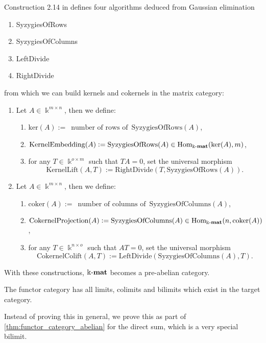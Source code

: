 \begin{example}\label{ex:kmat_pre-abelian}
Construction 2.14 in \cite{[Posur]} defines four algorithms deduced from Gaussian elimination
\begin{enumerate}
\renewcommand{\labelenumi}{(\theenumi)}
\item SyzygiesOfRows
\item SyzygiesOfColumns
\item LeftDivide
\item RightDivide
\end{enumerate}
from which we can build kernels and cokernels in the matrix category:
\begin{enumerate}
\renewcommand{\labelenumi}{(\theenumi)}
\item Let $A \in \Bbbk^{m\times n}$, then we define:
\begin{enumerate}
\renewcommand{\labelenumii}{(\alph{enumii})}
\item $\mathrm{ker}(A) :=\,\text{ number of rows of }\,\mathrm{SyzygiesOfRows}(A)$,
\item $\mathrm{KernelEmbedding}(A) := \mathrm{SyzygiesOfRows}(A) \in \mathrm{Hom}_{\Bbbk\textnormal{-}\mathbf{mat}}(\mathrm{ker}(A), m)$,
\item for any $T \in \Bbbk^{o\times m}$ such that $TA = 0$, set the universal morphism
\[
\mathrm{KernelLift}(A,T) := \mathrm{RightDivide}(T, \mathrm{SyzygiesOfRows}(A)).
\]
\end{enumerate}
\item Let $A \in \Bbbk^{m\times n}$, then we define:
\begin{enumerate}
\renewcommand{\labelenumii}{(\alph{enumii})}
\item $\mathrm{coker}(A) :=\,\text{ number of columns of }\,\mathrm{SyzygiesOfColumns}(A)$,
\item $\mathrm{CokernelProjection}(A) := \mathrm{SyzygiesOfColumns}(A) \in \mathrm{Hom}_{\Bbbk\textnormal{-}\mathbf{mat}}(n, \mathrm{coker}(A))$,
\item for any $T \in \Bbbk^{n\times o}$ such that $AT = 0$, set the universal morphism
\[
\mathrm{CokernelColift}(A,T) := \mathrm{LeftDivide}(\mathrm{SyzygiesOfColumns}(A), T).
\]
\end{enumerate}
\end{enumerate}
With these constructions, $\Bbbk\textnormal{-}\mathbf{mat}$ becomes a pre-abelian category.
\end{example}






\begin{theorem}
The functor category has all limits, colimits and bilimits which exist in the target category.
\end{theorem}

Instead of proving this in general, we prove this as part of \ref{thm:functor_category_abelian} for the direct sum, which is a very special bilimit.

